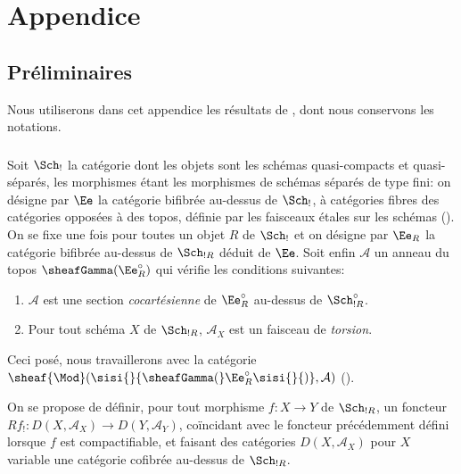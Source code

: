 \section{Appendice}\pageoriginale

\setcounter{subsection}{-1}
\subsection{Préliminaires}

Nous utiliserons dans cet appendice les résultats de ,
dont nous conservons les notations.

\subsubsection{}
Soit $\Sch_{!}$ la catégorie dont les objets sont les schémas
quasi-compacts et quasi-séparés, les morphismes étant les morphismes
de schémas séparés de type fini: on désigne par $\Ee$ la
catégorie bifibrée au-dessus de $\Sch_{!}$, à catégories fibres des
catégories opposées à des topos, définie par les faisceaux étales sur
les schémas (). On se fixe une fois pour toutes un
objet $R$ de $\Sch_{!}$ et on désigne par $\Ee_{R}$ la
catégorie bifibrée au-dessus de $\Sch_{!R}$ déduit de
$\Ee$. Soit enfin $\mathcal{A}$ un anneau du topos
$\sheafGamma(\Ee^{\circ}_{R})$ qui vérifie les conditions
suivantes:
\begin{enumerate}
\renewcommand{\theenumi}{\roman{enumi}}
\renewcommand{\labelenumi}{(\theenumi)}
\item $\mathcal{A}$ est une section \emph{cocartésienne} de
$\Ee^{\circ}_{R}$ au-dessus de $\Sch^{\circ}_{!R}$.

\item Pour tout schéma $X$ de $\Sch_{!R}$, $\mathcal{A}_{X}$ est un
faisceau de \emph{torsion}.
\end{enumerate}

Ceci posé, nous travaillerons avec la catégorie
$\sheaf{\Mod}(\sisi{}{\sheafGamma(}\Ee^{\circ}_{R}\sisi{}{)},\mathcal{A})$ ().

On se propose de définir, pour tout morphisme $f:X\rightarrow Y$ de
$\Sch_{!R}$, un foncteur $Rf_{!}:D(X,\mathcal{A}_X)\rightarrow
D(Y,\mathcal{A}_{Y})$, coïncidant avec le foncteur précédemment défini
lorsque $f$ est compactifiable, et faisant des catégories
$D(X,\mathcal{A}_{X})$ pour $X$ variable une catégorie cofibrée
au-dessus de $\Sch_{!R}$.

